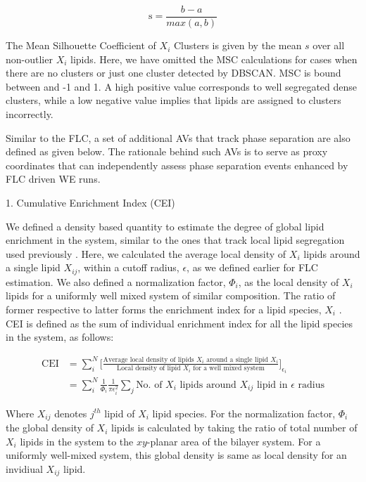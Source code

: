 \documentclass{biophys-new}
\begin{document}
\begin{equation}
\label{eq:SC}
\text{s} = \frac{b - a}{max(a,b)}
\end{equation}

The Mean Silhouette Coefficient of $X_i$ Clusters is given by the mean $s$ over all non-outlier $X_i$ lipids.
Here, we have omitted the MSC calculations for cases when there are no clusters or just one cluster detected by DBSCAN. 
MSC is bound between and -1 and 1.
A high positive value corresponds to well segregated dense clusters, while a low negative value implies that lipids are assigned to clusters incorrectly.  

Similar to the FLC, a set of additional AVs that track phase separation are also defined as given below.
The rationale behind such AVs is to serve as proxy coordinates that can independently assess phase separation events enhanced by FLC driven WE runs. 

1. Cumulative Enrichment Index (CEI)

We defined a density based quantity to estimate the degree of global lipid enrichment in the system, similar to the ones that track local lipid segregation used previously \cite{Gu2019, Gu2020}.
Here, we calculated the average local density of $X_i$ lipids around a single lipid $X_{ij}$, within a cutoff radius, $\epsilon$, as we defined earlier for FLC estimation.
We also defined a normalization factor, $\Phi_i$, as the local density of $X_i$ lipids for a uniformly well mixed system of similar composition.
The ratio of former respective to latter forms the enrichment index for a lipid species, $X_i$ .
CEI is defined as the sum of individual enrichment index for all the lipid species in the system, as follows:  

\begin{equation}
    \begin{aligned}
    \label{eq:CLT}
    \text{CEI} {}   & = \sum_{i}^{N}\Bigg[\frac{\text{Average local density of lipids $X_i$ around a single lipid $X_i$}}{\text{Local density of lipid $X_i$ for a well mixed system}}\Bigg]_{\text{$\epsilon_i$}} \\
                    & =  \sum_{i}^{N} \frac{1}{\Phi_i}\frac{1}{\text{$\pi\epsilon_i^2$}}\sum_{j}\text{No. of $X_i$ lipids around $X_{ij}$ lipid in $\epsilon$ radius}
    \end{aligned}
\end{equation}

Where $X_{ij}$ denotes $j^{th}$ lipid of $X_i$ lipid species.
For the normalization factor, $\Phi_i$ the global density of $X_i$ lipids is calculated by taking the ratio of total number of $X_i$ lipids in the system to the $xy$-planar area of the bilayer system.
For a uniformly well-mixed system, this global density is same as local density for an invidiual $X_{ij}$ lipid.
\end{document}
